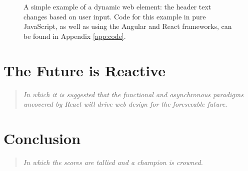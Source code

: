 \documentclass[12pt,letterpaper]{article}
\begin{document}
\begin{SCfigure}[][h]
	\centering
	\caption{A simple example of a dynamic web element: the header text changes based on user input. Code for this example in pure JavaScript, as well as using the Angular and React frameworks, can be found in Appendix \ref{app:code}.}
	\label{fig:Example}
\end{SCfigure}






\section{The Future is Reactive}
\vspace{-12pt}

\begin{quote}
	\singlespacing
	\emph{In which it is suggested that the functional and asynchronous paradigms uncovered by React will drive web design for the foreseeable future.}
\end{quote}




\section{Conclusion}
\vspace{-12pt}

\begin{quote}
	\singlespacing
	\emph{In which the scores are tallied and a champion is crowned.}
\end{quote}
\end{document}
